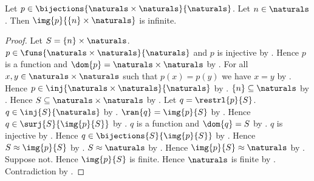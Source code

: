 \begin{proposition}\label{natural_pairing_row_infinite}
    Let $p\in\bijections{\naturals\times\naturals}{\naturals}$.
    Let $n\in\naturals$.
    Then $\img{p}{\{n\}\times\naturals}$ is infinite.
\end{proposition}
\begin{proof}
    Let $S=\{n\}\times\naturals$.
    $p\in\funs{\naturals\times\naturals}{\naturals}$ and
        $p$ is injective by .
    Hence $p$ is a function and
        $\dom{p}=\naturals\times\naturals$
        by .
    For all $x,y\in\naturals\times\naturals$ such that $p(x)=p(y)$
        we have $x=y$ by .
    Hence $p\in\inj{\naturals\times\naturals}{\naturals}$
        by .
    $\{n\}\subseteq\naturals$ by .
    Hence $S\subseteq\naturals\times\naturals$
        by .
    Let $q=\restrl{p}{S}$.
    $q\in\inj{S}{\naturals}$ by .
    $\ran{q}=\img{p}{S}$ by .
    Hence $q\in\surj{S}{\img{p}{S}}$ by .
    $q$ is a function and $\dom{q}=S$
        by .
    $q$ is injective by .
    Hence $q\in\bijections{S}{\img{p}{S}}$ by .
    Hence $S\approx\img{p}{S}$ by .
    $S\approx\naturals$ by .
    Hence $\img{p}{S}\approx\naturals$
        by .
    Suppose not.
    Hence $\img{p}{S}$ is finite.
    Hence $\naturals$ is finite by .
    Contradiction by .
\end{proof}

